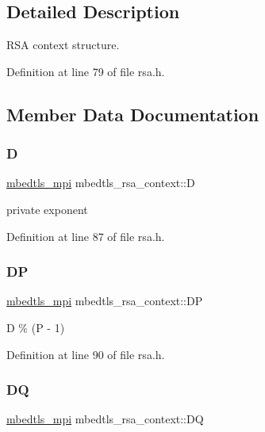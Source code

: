 \subsection{Detailed Description}
R\+SA context structure. 

Definition at line 79 of file rsa.\+h.



\subsection{Member Data Documentation}
\mbox{\label{structmbedtls__rsa__context_ad9552371239922dd67d146b937d1aada}} 
\subsubsection{\texorpdfstring{D}{D}}
{\footnotesize\ttfamily \mbox{\hyperlink{structmbedtls__mpi}{mbedtls\+\_\+mpi}} mbedtls\+\_\+rsa\+\_\+context\+::D}

private exponent 

Definition at line 87 of file rsa.\+h.

\mbox{\label{structmbedtls__rsa__context_aa46b066a4cf04deb4e627e69e6b036e8}} 
\subsubsection{\texorpdfstring{DP}{DP}}
{\footnotesize\ttfamily \mbox{\hyperlink{structmbedtls__mpi}{mbedtls\+\_\+mpi}} mbedtls\+\_\+rsa\+\_\+context\+::\+DP}

D \% (P -\/ 1) 

Definition at line 90 of file rsa.\+h.

\mbox{\label{structmbedtls__rsa__context_a753b59e552469b6abb6fad9853a2042d}} 
\subsubsection{\texorpdfstring{DQ}{DQ}}
{\footnotesize\ttfamily \mbox{\hyperlink{structmbedtls__mpi}{mbedtls\+\_\+mpi}} mbedtls\+\_\+rsa\+\_\+context\+::\+DQ}

